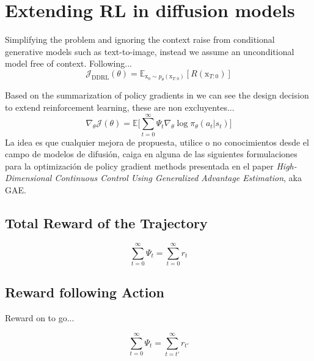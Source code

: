 \section{Extending RL in diffusion models}

Simplifying the problem and ignoring the context raise from conditional generative models such as text-to-image, instead we assume an unconditional model free of context. Following...
\begin{equation}\label{difusion-rl-objective-2}
  \mathcal{J}_{\text{DDRL}}(\theta)
  = \mathbb{E}_{\mathrm{x}_{0}\sim p_{\theta}(\mathrm{x}_{T:0})}[R(\mathrm{x}_{T:0})]
\end{equation}

Based on the summarization of policy gradients in \cite{schulman2015high} we can see the design decision to extend reinforcement learning, these are non excluyentes...
\begin{equation}\label{eqn:general-pg-estimation-form}
  \nabla_{\theta}\mathcal{J}(\theta) = \mathbb{E}\bigg[\sum_{t=0}^{\infty}\Psi_{t}\nabla_{\theta}\log\pi_{\theta}(a_{t}|s_{t}) \bigg]
\end{equation}
La idea es que cualquier mejora de propuesta, utilice o no conocimientos
desde el campo de modelos de difusión, caiga en alguna de las siguientes
formulaciones para la optimización de policy gradient methods presentada
en el paper \textit{High-Dimensional Continuous Control Using Generalized Advantage Estimation}, aka GAE.


\subsection{Total Reward of the Trajectory}

\begin{equation}\label{eqn:psi-total-reward}
  \sum_{t=0}^{\infty}\Psi_{t} = \sum_{t=0}^{\infty} r_{t}
\end{equation}


\subsection{Reward following Action}

Reward on to go...

\begin{equation}\label{eqn:psi-reward-following-action}
  \sum_{t=0}^{\infty}\Psi_{t} = \sum_{t=t'}^{\infty} r_{t'}
\end{equation}

